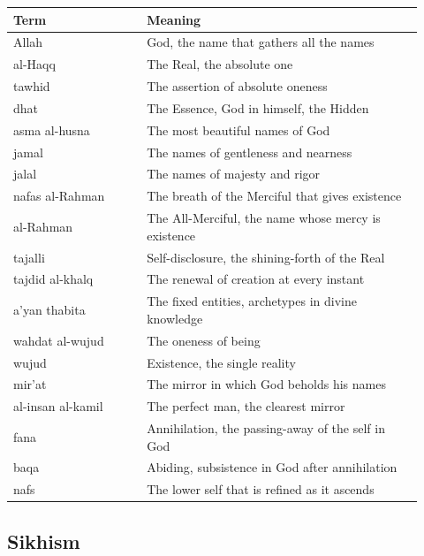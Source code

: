 \begin{longtable}{L{0.30\linewidth} L{0.62\linewidth}}
\toprule
\textbf{Term} & \textbf{Meaning} \\
\midrule
\endhead
Allah & God, the name that gathers all the names \\
al-Haqq & The Real, the absolute one \\
tawhid & The assertion of absolute oneness \\
dhat & The Essence, God in himself, the Hidden \\
asma al-husna & The most beautiful names of God \\
jamal & The names of gentleness and nearness \\
jalal & The names of majesty and rigor \\
nafas al-Rahman & The breath of the Merciful that gives existence \\
al-Rahman & The All-Merciful, the name whose mercy is existence \\
tajalli & Self-disclosure, the shining-forth of the Real \\
tajdid al-khalq & The renewal of creation at every instant \\
a'yan thabita & The fixed entities, archetypes in divine knowledge \\
wahdat al-wujud & The oneness of being \\
wujud & Existence, the single reality \\
mir'at & The mirror in which God beholds his names \\
al-insan al-kamil & The perfect man, the clearest mirror \\
fana & Annihilation, the passing-away of the self in God \\
baqa & Abiding, subsistence in God after annihilation \\
nafs & The lower self that is refined as it ascends \\
\bottomrule
\end{longtable}

\subsection{Sikhism}

